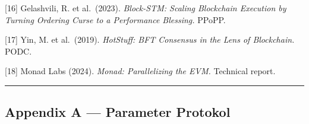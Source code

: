 \documentclass[11pt,a4paper]{article}
\begin{document}
{[}16{]} Gelashvili, R. et al.~(2023). \emph{Block-STM: Scaling Blockchain Execution by Turning Ordering Curse to a Performance Blessing.} PPoPP.

{[}17{]} Yin, M. et al.~(2019). \emph{HotStuff: BFT Consensus in the Lens of Blockchain.} PODC.

{[}18{]} Monad Labs (2024). \emph{Monad: Parallelizing the EVM.} Technical report.

\begin{center}\rule{0.5\linewidth}{0.5pt}\end{center}

\hypertarget{appendix-a-parameter-protokol}{%
\subsection{Appendix A --- Parameter Protokol}\label{appendix-a-parameter-protokol}}
\end{document}
